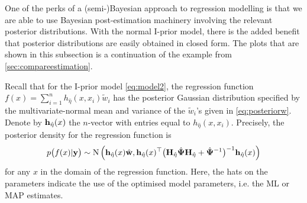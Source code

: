One of the perks of a (semi-)Bayesian approach to regression modelling is that we are able to use Bayesian post-estimation machinery involving the relevant posterior distributions.
With the normal I-prior model, there is the added benefit that posterior distributions are easily obtained in closed form.
The plots that are shown in this subsection is a continuation of the example from \autoref{sec:compareestimation}.

Recall that for the I-prior model \cref{eq:model2}, the regression function $f(x) = \sum_{i=1}^n h_{\hat\eta}(x,x_i)\tilde w_i$
has the posterior Gaussian distribution specified by the  multivariate-normal mean and variance of the $\tilde w_i$'s given in \cref{eq:posteriorw}.
Denote by ${\mathbf h}_{\hat\eta}(x)$ the $n$-vector with entries equal to $h_{\hat\eta}(x,x_i)$.
Precisely, the posterior density for the regression function is
\begin{align}
  p\big(f(x) | {\mathbf y} \big) \sim \operatorname{N} \Big( 
  {\mathbf h}_{\hat\eta}(x)\hat{{\mathbf w}}, 
  {\mathbf h}_{\hat\eta}(x)^\top \big({\mathbf H}_{\hat\eta}\hat{{\bm\Psi}}{\mathbf H}_{\hat\eta} + \hat{{\bm\Psi}}^{-1}\big)^{-1} {\mathbf h}_{\hat\eta}(x) 
  \Big)
\end{align}
for any $x$ in the domain of the regression function.
Here, the hats on the parameters indicate the use of the optimised model parameters, i.e. the ML or MAP estimates.

